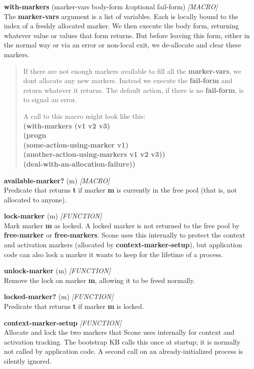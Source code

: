 \documentclass[titlepage,twoside,openright,11pt]{article}
\begin{document}
\textbf{with-markers} (marker-vars body-form \&optional fail-form)
\emph{{[}MACRO{]}\\
}The \textbf{marker-vars} argument is a list of variables. Each is
locally bound to the index of a freshly allocated marker. We then
execute the body form, returning whatever value or values that form
returns. But before leaving this form, either in the normal way or via
an error or non-local exit, we de-allocate and clear these markers.

\begin{quote}
If there are not enough markers available to fill all the
\textbf{marker-vars}, we don\textquotesingle t allocate any new markers.
Instead we execute the \textbf{fail-form} and return whatever it
returns. The default action, if there is no \textbf{fail-form}, is to
signal an error.

A call to this macro might look like this:\\
\textbf{(with-markers (v1 v2 v3)\\
(progn\\
(some-action-using-marker v1)\\
(another-action-using-markers v1 v2 v3))\\
(deal-with-an-allocation-failure))}
\end{quote}

\textbf{available-marker?} (m) \emph{{[}MACRO{]}}\\
Predicate that returns \textbf{t} if marker \textbf{m} is currently
in the free pool (that is, not allocated to anyone).

\textbf{lock-marker} (m) \emph{{[}FUNCTION{]}}\\
Mark marker \textbf{m} as locked. A locked marker is not returned to
the free pool by \textbf{free-marker} or \textbf{free-markers}. Scone
uses this internally to protect the context and activation markers
(allocated by \textbf{context-marker-setup}), but application code can
also lock a marker it wants to keep for the lifetime of a process.

\textbf{unlock-marker} (m) \emph{{[}FUNCTION{]}}\\
Remove the lock on marker \textbf{m}, allowing it to be freed
normally.

\textbf{locked-marker?} (m) \emph{{[}FUNCTION{]}}\\
Predicate that returns \textbf{t} if marker \textbf{m} is locked.

\textbf{context-marker-setup} \emph{{[}FUNCTION{]}}\\
Allocate and lock the two markers that Scone uses internally for
context and activation tracking. The bootstrap KB calls this once at
startup; it is normally not called by application code. A second call
on an already-initialized process is silently ignored.
\end{document}

